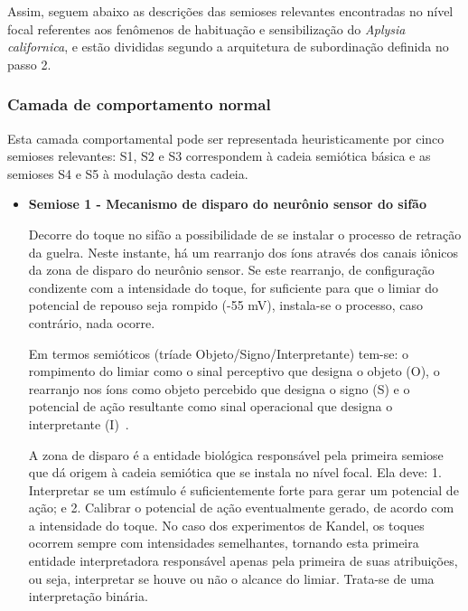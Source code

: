 Assim, seguem abaixo as descrições das semioses relevantes encontradas no nível focal referentes aos fenômenos de habituação e sensibilização do \textit{Aplysia californica}, e estão divididas segundo a arquitetura de subordinação definida no passo 2.

\subsubsection*{Camada de comportamento normal}

Esta camada comportamental pode ser representada heuristicamente por cinco semioses relevantes: S1, S2 e S3 correspondem à cadeia semiótica básica e as semioses S4 e S5 à modulação desta cadeia.

\begin{itemize}

	\item \textbf{Semiose 1 - Mecanismo de disparo do neurônio sensor do sifão}

	Decorre do toque no sifão a possibilidade de se instalar o processo de retração da guelra. Neste instante, há um rearranjo dos íons através dos canais iônicos da zona de disparo do neurônio sensor. Se este rearranjo, de configuração condizente com a intensidade do toque, for suficiente para que o limiar do potencial de repouso seja rompido (-55 mV), instala-se o processo, caso contrário, nada ocorre.

	Em termos semióticos (tríade Objeto/Signo/Interpretante) tem-se: o rompimento do limiar como o sinal perceptivo que designa o objeto (O), o rearranjo nos íons como objeto percebido que designa o signo (S) e o potencial de ação resultante como sinal operacional que designa o interpretante (I)~\cite{kandel06, kandel00, lent01}.


	A zona de disparo é a entidade biológica responsável pela primeira semiose que dá origem à cadeia semiótica que se instala no nível focal. Ela deve: 1. Interpretar se um estímulo é suficientemente forte para gerar um potencial de ação; e 2. Calibrar o potencial de ação eventualmente gerado, de acordo com a intensidade do toque. No caso dos experimentos de Kandel, os toques ocorrem sempre com intensidades semelhantes, tornando esta primeira entidade interpretadora responsável apenas pela primeira de suas atribuições, ou seja, interpretar se houve ou não o alcance do limiar. Trata-se de uma interpretação binária.


\end{itemize}
